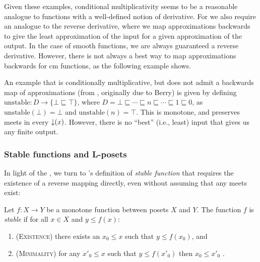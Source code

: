 Given these examples, conditional multiplicativity seems to be a
reasonable analogue to functions with a well-defined notion of
derivative. For \GPS we also require an analogue to the reverse
derivative, where we map approximations backwards to give the least
approximation of the input for a given approximation of the output. In
the case of smooth functions, we are always guaranteed a reverse
derivative. However, there is not always a best way to map
approximations backwards for cm functions, as the following example
shows.

\begin{example}
  \label{ex:non-stable-function}
  An example that is conditionally multiplicative, but does not admit
  a backwards map of approximations (from \citet[just
  before Lemma 12.2.3]{amadio-curien}, originally due to Berry) is given by defining
  $\mathrm{unstable} : D \to \{\bot \sqsubseteq \top\}$, where
  $D = \bot \sqsubseteq \cdots \sqsubseteq n \sqsubseteq \cdots
  \sqsubseteq 1 \sqsubseteq 0$, as $\mathrm{unstable}(\bot) = \bot$
  and $\mathrm{unstable}(n) = \top$. This is monotone, and preserves
  meets in every $\mathop{\downarrow}(x)$. However, there is no ``best'' (i.e.,
  least) input that gives us any finite output.
\end{example}

\subsubsection{Stable functions and L-posets}
\label{sec:stab}

In light of the , we turn to
\citet{berry79}'s definition of \emph{stable function} that requires
the existence of a reverse mapping directly, even without assuming
that any meets exist:

\begin{definition}
  Let $f : X \to Y$ be a monotone function between posets $X$ and
  $Y$. The function $f$ is \emph{stable} if for all $x \in X$ and
  $y \leq f(x)$:
  \begin{enumerate}
  \item (\textsc{Existence}) there exists an $x_0 \leq x$ such that $y \leq f(x_0)$, and
  \item (\textsc{Minimality}) for any $x'_0 \leq x$ such that $y \leq f(x'_0)$ then
    $x_0 \leq x'_0$ .
  \end{enumerate}
\end{definition}

